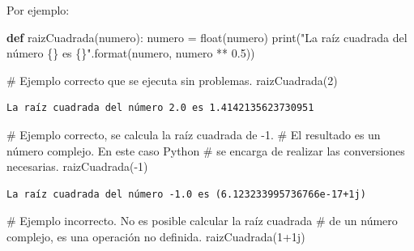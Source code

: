\documentclass[
  spanish,
  letterpaper,
]{scrbook}
\newenvironment{Shaded}{\begin{snugshade}}{\end{snugshade}}
\newcommand{\BuiltInTok}[1]{\textcolor[rgb]{0.00,0.23,0.31}{#1}}
\newcommand{\CommentTok}[1]{\textcolor[rgb]{0.37,0.37,0.37}{#1}}
\newcommand{\DecValTok}[1]{\textcolor[rgb]{0.68,0.00,0.00}{#1}}
\newcommand{\FloatTok}[1]{\textcolor[rgb]{0.68,0.00,0.00}{#1}}
\newcommand{\KeywordTok}[1]{\textcolor[rgb]{0.00,0.23,0.31}{\textbf{#1}}}
\newcommand{\NormalTok}[1]{\textcolor[rgb]{0.00,0.23,0.31}{#1}}
\newcommand{\OperatorTok}[1]{\textcolor[rgb]{0.37,0.37,0.37}{#1}}
\newcommand{\OtherTok}[1]{\textcolor[rgb]{0.00,0.23,0.31}{#1}}
\newcommand{\SpecialCharTok}[1]{\textcolor[rgb]{0.37,0.37,0.37}{#1}}
\newcommand{\StringTok}[1]{\textcolor[rgb]{0.13,0.47,0.30}{#1}}
\theoremstyle{definition}
\theoremstyle{remark}
\begin{document}
Por ejemplo:

\begin{Shaded}
\begin{Highlighting}[]
\KeywordTok{def}\NormalTok{ raizCuadrada(numero):}
\NormalTok{    numero }\OperatorTok{=} \BuiltInTok{float}\NormalTok{(numero)}
    \BuiltInTok{print}\NormalTok{(}\StringTok{"La raíz cuadrada del número }\SpecialCharTok{\{\}}\StringTok{ es }\SpecialCharTok{\{\}}\StringTok{"}\NormalTok{.}\BuiltInTok{format}\NormalTok{(numero, numero }\OperatorTok{**} \FloatTok{0.5}\NormalTok{))}
\end{Highlighting}
\end{Shaded}

\begin{Shaded}
\begin{Highlighting}[]
\CommentTok{\# Ejemplo correcto que se ejecuta sin problemas.}
\NormalTok{raizCuadrada(}\DecValTok{2}\NormalTok{)}
\end{Highlighting}
\end{Shaded}

\begin{verbatim}
La raíz cuadrada del número 2.0 es 1.4142135623730951
\end{verbatim}

\begin{Shaded}
\begin{Highlighting}[]
\CommentTok{\# Ejemplo correcto, se calcula la raíz cuadrada de {-}1.}
\CommentTok{\# El resultado es un número complejo. En este caso Python}
\CommentTok{\# se encarga de realizar las conversiones necesarias.}
\NormalTok{raizCuadrada(}\OperatorTok{{-}}\DecValTok{1}\NormalTok{)}
\end{Highlighting}
\end{Shaded}

\begin{verbatim}
La raíz cuadrada del número -1.0 es (6.123233995736766e-17+1j)
\end{verbatim}

\begin{Shaded}
\begin{Highlighting}[]
\CommentTok{\# Ejemplo incorrecto. No es posible calcular la raíz cuadrada}
\CommentTok{\# de un número complejo, es una operación no definida.}
\NormalTok{raizCuadrada(}\DecValTok{1}\OperatorTok{+}\OtherTok{1j}\NormalTok{)}
\end{Highlighting}
\end{Shaded}
\end{document}
